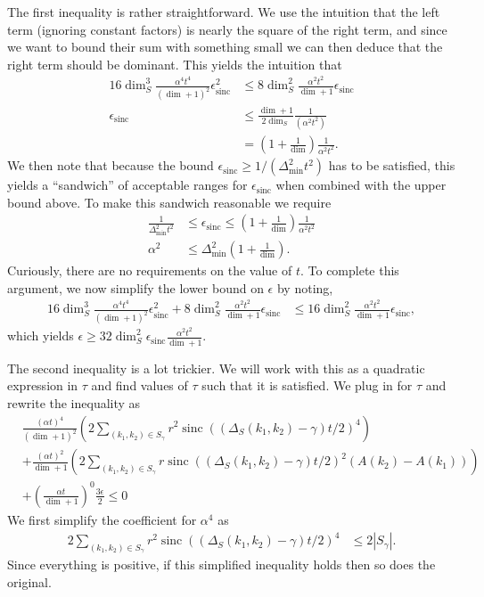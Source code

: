 \documentclass{article}
\newcommand{\parens}[1]{\left( #1 \right)}
\DeclareMathOperator{\sinc}{sinc}
\begin{document}
    The first inequality is rather straightforward. We use the intuition that the left term (ignoring constant factors) is nearly the square of the right term, and since we want to bound their sum with something small we can then deduce that the right term should be dominant. This yields the intuition that
    \begin{align}
        16 \dim_S^3 \frac{\alpha^4 t^4}{(\dim + 1)^2} \epsilon_{\sinc}^2 &\leq 8 \dim_S^2 \frac{\alpha^2 t^2}{\dim + 1} \epsilon_{\sinc} \\
        \epsilon_{\sinc} &\leq \frac{\dim + 1}{2 \dim_S} \frac{1}{(\alpha^2 t^2)} \\
        &= \parens{1 + \frac{1}{\dim}} \frac{1}{\alpha^2 t^2}.
    \end{align}
    We then note that because the bound $\epsilon_{\sinc} \geq 1/(\Delta_{\min}^2 t^2)$ has to be satisfied, this yields a ``sandwich'' of acceptable ranges for $\epsilon_{\sinc}$ when combined with the upper bound above. To make this sandwich reasonable we require
    \begin{align}
        \frac{1}{\Delta_{\min}^2 t^2} &\leq \epsilon_{\sinc} \leq \parens{1 + \frac{1}{\dim}} \frac{1}{\alpha^2 t^2} \\
        \alpha^2 &\leq \Delta_{\min}^2 \parens{1 + \frac{1}{\dim}}.
    \end{align}
    Curiously, there are no requirements on the value of $t$. To complete this argument, we now simplify the lower bound on $\epsilon$ by noting,
    \begin{align}
        16 \dim_S^3 \frac{\alpha^4 t^4}{(\dim + 1)^2} \epsilon_{\sinc}^2 + 8 \dim_S^2 \frac{\alpha^2 t^2}{\dim + 1}\epsilon_{\sinc} &\leq 16 \dim_S^2 \frac{\alpha^2 t^2}{\dim + 1}\epsilon_{\sinc},
    \end{align}
    which yields $\epsilon \geq 32 \dim_S^2 \epsilon_{\sinc} \frac{\alpha^2 t^2}{\dim + 1}$.
    
    The second inequality is a lot trickier. We will work with this as a quadratic expression in $\tau$ and find values of $\tau$ such that it is satisfied. We plug in for $\tau$ and rewrite the inequality as 
    \begin{align}
        &\frac{(\alpha t)^4}{(\dim + 1)^2} \parens{2  \sum_{(k_1, k_2) \in S_{\gamma}} r^2 \sinc((\Delta_S(k_1, k_2) - \gamma) t/2)^4} \nonumber \\
        &+ \frac{(\alpha t)^2}{\dim + 1} \parens{2  \sum_{(k_1, k_2) \in S_{\gamma}}r \sinc((\Delta_S(k_1, k_2) - \gamma) t/2)^2 (A(k_2) - A(k_1))} \nonumber \\
        &+ \parens{\frac{\alpha t}{\dim + 1}}^0 \frac{3 \epsilon}{2} \leq 0
    \end{align}
    We first simplify the coefficient for $\alpha^4$ as 
    \begin{align}
        2 \sum_{(k_1, k_2) \in S_{\gamma}} r^2 \sinc((\Delta_S(k_1, k_2) - \gamma) t/2)^4 &\leq 2 |S_{\gamma}|.
    \end{align}
    Since everything is positive, if this simplified inequality holds then so does the original. 
    
\end{document}
